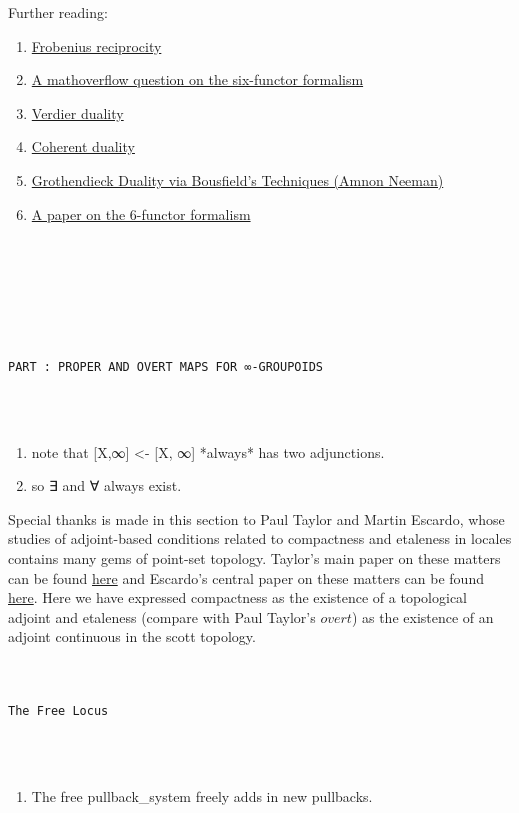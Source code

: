 \documentclass{book}
\theoremstyle{definition}
\newcounter{pcounter}
\renewcommand{\chapter}[1]{
\newpage
{
\Huge 
\begin{center}
\ \\
\ \\
\thispagestyle{empty}
\texttt{#1}
\end{center}}
\ \\
\ \\
}
\newcounter{partcount}
\renewcommand{\part}[1]{
\newpage
{
\Huge 
\begin{center}
\ \\
\ \\
\ \\
\ \\
\ \\
\ \\
\thispagestyle{empty}
\texttt{PART {\thepartcount}: #1}
\stepcounter{partcount}
\end{center}}
\ \\
\ \\
}
\begin{document}
Further reading:
\begin{enumerate}
\item \href{https://ncatlab.org/nlab/show/Frobenius+reciprocity}{Frobenius reciprocity}
\item \href{https://mathoverflow.net/questions/404706/how-duality-follows-from-a-six-functor-formalism}{A mathoverflow question on the six-functor formalism}
\item \href{https://en.wikipedia.org/wiki/Verdier_duality}{Verdier duality}
\item \href{https://en.wikipedia.org/wiki/Coherent_duality}{Coherent duality}
\item \href{https://www.ams.org/journals/jams/1996-9-01/S0894-0347-96-00174-9/S0894-0347-96-00174-9.pdf}{Grothendieck Duality via Bousfield's Techniques (Amnon Neeman)}
\item \href{https://arxiv.org/pdf/1501.01999.pdf}{A paper on the 6-functor formalism}
\end{enumerate} 




\part{PROPER AND OVERT MAPS FOR ∞-GROUPOIDS}


\begin{enumerate}
\item note that [X,∞] <- [X, ∞] *always* has two adjunctions. 
\item so ∃ and ∀ always exist. 
\end{enumerate}

Special thanks is made in this section to Paul Taylor and Martin Escardo, whose studies of adjoint-based conditions related to compactness and etaleness in locales contains many gems of point-set topology. Taylor's main paper on these matters can be found \href{https://paultaylor.eu/ASD/foufct/foufct.pdf}{here} and Escardo's central paper on these matters can be found \href{https://www.cs.bham.ac.uk/~mhe/papers/barbados.pdf}{here}. Here we have expressed compactness as the existence of a topological adjoint and etaleness (compare with Paul Taylor's $\textit{overt}$) as the existence of an adjoint continuous in the scott topology. 


\chapter{The Free Locus}

\begin{enumerate}
\item The free pullback_system freely adds in new pullbacks.
\end{enumerate}
\end{document}
